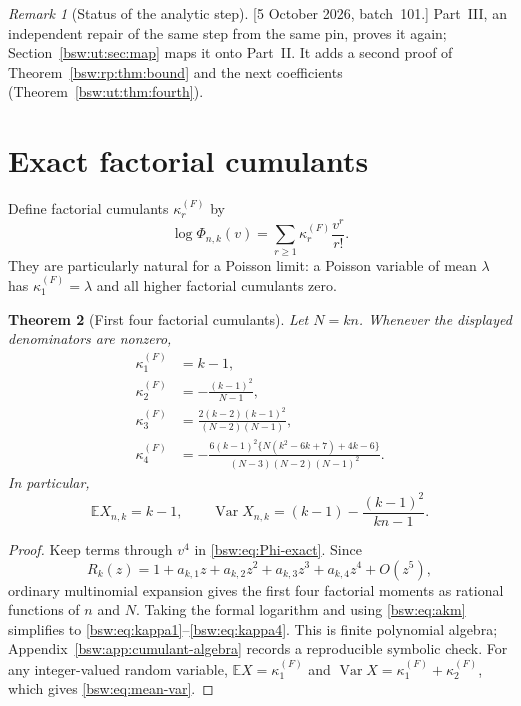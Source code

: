 \documentclass[11pt,letterpaper]{article}
\newtheorem{theorem}{Theorem}[section]
\theoremstyle{definition}
\theoremstyle{remark}
\newtheorem{remark}[theorem]{Remark}
\newcommand{\EE}{\mathbb E}
\newcommand{\Var}{\operatorname{Var}}
\begin{document}
\begin{remark}[Status of the analytic step]
[5 October 2026, batch~101.]  Part~III, an independent repair of the same
step from the same pin, proves it again; Section~\ref{bsw:ut:sec:map} maps
it onto Part~II.  It adds a second proof of
Theorem~\ref{bsw:rp:thm:bound} and the next coefficients
(Theorem~\ref{bsw:ut:thm:fourth}).
\end{remark}

\section{Exact factorial cumulants}

Define factorial cumulants $\kappa_r^{(F)}$ by
\begin{equation}\label{bsw:eq:fact-cumulants}
 \log\Phi_{n,k}(v)=\sum_{r\ge1}\kappa_r^{(F)}\frac{v^r}{r!}.
\end{equation}
They are particularly natural for a Poisson limit: a Poisson variable of mean
$\lambda$ has $\kappa_1^{(F)}=\lambda$ and all higher factorial cumulants zero.

\begin{theorem}[First four factorial cumulants]\label{bsw:thm:cumulants}
Let $N=kn$.  Whenever the displayed denominators are nonzero,
\begin{align}
 \kappa_1^{(F)}&=k-1,\label{bsw:eq:kappa1}\\
 \kappa_2^{(F)}&=-\frac{(k-1)^2}{N-1},\label{bsw:eq:kappa2}\\
 \kappa_3^{(F)}&=\frac{2(k-2)(k-1)^2}{(N-2)(N-1)},\label{bsw:eq:kappa3}\\
 \kappa_4^{(F)}&=-\frac{6(k-1)^2
 \{N(k^2-6k+7)+4k-6\}}
 {(N-3)(N-2)(N-1)^2}.
 \label{bsw:eq:kappa4}
\end{align}
In particular,
\begin{equation}\label{bsw:eq:mean-var}
 \boxed{\displaystyle
 \EE X_{n,k}=k-1,
 \qquad
 \Var X_{n,k}=(k-1)-\frac{(k-1)^2}{kn-1}.}
\end{equation}
\end{theorem}

\begin{proof}
Keep terms through $v^4$ in \eqref{bsw:eq:Phi-exact}.  Since
\[
 R_k(z)=1+a_{k,1}z+a_{k,2}z^2+a_{k,3}z^3+a_{k,4}z^4+O(z^5),
\]
ordinary multinomial expansion gives the first four factorial moments as
rational functions of $n$ and $N$.  Taking the formal logarithm and using
\eqref{bsw:eq:akm} simplifies to \eqref{bsw:eq:kappa1}--\eqref{bsw:eq:kappa4}.  This is
finite polynomial algebra; Appendix~\ref{bsw:app:cumulant-algebra} records a
reproducible symbolic check.  For any integer-valued random variable,
$\EE X=\kappa_1^{(F)}$ and
$\Var X=\kappa_1^{(F)}+\kappa_2^{(F)}$, which gives
\eqref{bsw:eq:mean-var}.
\end{proof}
\end{document}
